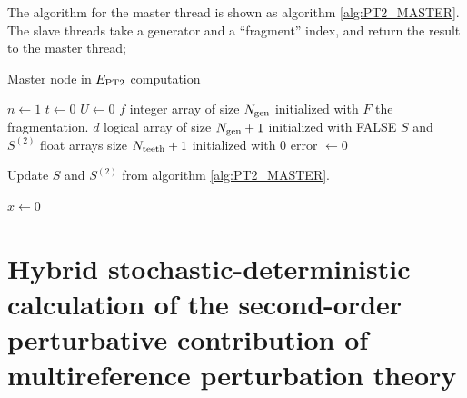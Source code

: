 \documentclass[./thesis.tex]{subfiles}
\begin{document}
The algorithm for the master thread is shown as algorithm \ref{alg:PT2_MASTER}. The slave threads take a generator and a ``fragment'' index, and return the result to the master thread;

\begin{algorithm}
	\caption{Master node in $E_\text{PT2}$ computation}
	\label{alg:PT2_MASTER}         
	$n \gets 1$ \;
	$t \gets 0$ \;
	$U \gets 0$ \;
	$f$ integer array of size ${N_\text{gen}}$ initialized with $F$ the fragmentation. \;
	$d$ logical array of size ${N_\text{gen}}+1$ initialized with FALSE \;
	$S$ and $S^{(2)}$ float arrays size $N_\text{teeth}+1$ initialized with $0$ \;
        error $\gets 0$ \;
\end{algorithm}


\begin{algorithm}
	\caption{Update $S$ and $S^{(2)}$ from algorithm \ref{alg:PT2_MASTER}.}
	\label{alg:UPDATE_S}  
	
					
	$x \gets 0$ \;
\end{algorithm}



\clearpage

\section{Hybrid stochastic-deterministic calculation of the second-order
perturbative contribution of multireference perturbation theory}

\end{document}
